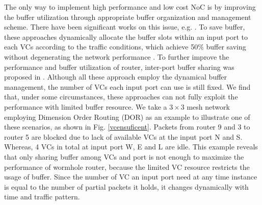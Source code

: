 \documentclass[10pt,conference]{IEEEtran}
\begin{document}
The only way to implement high performance and low cost NoC is by improving the buffer utilization through appropriate buffer organization and management scheme. There have been significant works on this issue, e.g. \cite{NPKV06,4555894,5770788,6310960}
\cite{Neishaburi:2009:RAN:1531542.1531658}. To save buffer, these approaches dynamically allocate the buffer slots within an input port to each VCs according to the traffic conditions, which achieve 50\% buffer saving without degenerating the network performance \cite{NPKV06}. To further improve the performance and buffer utilization of router, inter-port buffer sharing was proposed in \cite{Neishaburi:2009:RAN:1531542.1531658}\cite{5770788}. Although all these approach employ the dynamical buffer management, the number of VCs each input port can use is still fixed. We find that, under some circumstances, these approaches can not fully exploit the performance with limited buffer resource. We take a $3\times 3$ mesh network employing Dimension Order Routing (DOR) as an example to illustrate one of these scenarios, as shown in Fig. \ref{vcensuficent}. Packets from router 9 and 3 to router 5 are blocked due to lack of available VCs at the input port N and S. Whereas, 4 VCs in total at input port W, E and L are idle. This example reveals that only sharing buffer among VCs and port is not enough to maximize the performance of wormhole router, because the limited VC resource restricts the usage of buffer. Since the number of VC an input port need at any time instance is equal to the number of partial packets it holds, it changes dynamically with time and traffic pattern.

\end{document}
